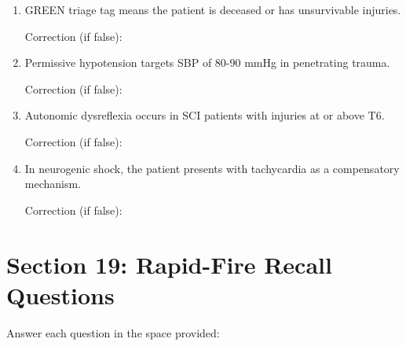 \documentclass[11pt]{article}
\begin{document}
\begin{enumerate}
    Correction (if false): \underline{\hspace{8cm}}
    
    \vspace{0.3cm}
    
    \item \underline{\hspace{1cm}} GREEN triage tag means the patient is deceased or has unsurvivable injuries.
    
    Correction (if false): \underline{\hspace{8cm}}
    
    \vspace{0.3cm}
    
    \item \underline{\hspace{1cm}} Permissive hypotension targets SBP of 80-90 mmHg in penetrating trauma.
    
    Correction (if false): \underline{\hspace{8cm}}
    
    \vspace{0.3cm}
    
    \item \underline{\hspace{1cm}} Autonomic dysreflexia occurs in SCI patients with injuries at or above T6.
    
    Correction (if false): \underline{\hspace{8cm}}
    
    \vspace{0.3cm}
    
    \item \underline{\hspace{1cm}} In neurogenic shock, the patient presents with tachycardia as a compensatory mechanism.
    
    Correction (if false): \underline{\hspace{8cm}}
    
\end{enumerate}

\vspace{1cm}

\section*{Section 19: Rapid-Fire Recall Questions}

Answer each question in the space provided:

\vspace{0.5cm}
\end{document}
